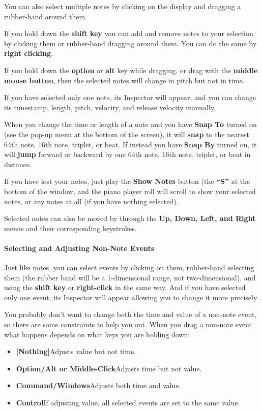 \documentclass[twoside,10pt]{article}
\begin{document}
You can also select multiple notes by clicking on the display and dragging a rubber-band around them.  

If you hold down the {\bf shift key} you can add and remove notes to your selection by clicking them or rubber-band dragging around them.  You can do the same by {\bf right clicking}.

If you hold down the {\bf option} or {\bf alt} key while dragging, or drag with the {\bf middle mouse button}, then the selected notes will change in pitch but not in time.

If you have selected only one note, its Inspector will appear, and you can change its timestamp, length, pitch, velocity, and release velocity manually.

When you change the time or length of a note and you have {\bf Snap To} turned on (see the pop-up menu at the bottom of the screen), it will {\bf snap} to the nearest 64th note, 16th note, triplet, or beat.  If instead you have {\bf Snap By} turned on, it will {\bf jump} forward or backward by one 64th note, 16th note, triplet, or beat in distance.

If you have lost your notes, just play the {\bf Show Notes} button (the {\bf ``S''} at the bottom of the window, and the piano player roll will scroll to show your selected notes, or any notes at all (if you have nothing selected).

Selected notes can also be moved by through the {\bf Up, Down, Left, and Right} menus and their corresponding keystrokes. 

\paragraph{Selecting and Adjusting Non-Note Events}

Just like notes, you can select events by clicking on them, rubber-band selecting them (the rubber band will be a 1-dimensional range, not two-dimensional), and using the {\bf shift key} or {\bf right-click} in the same way.  And if you have selected only one event, its Inspector will appear allowing you to change it more precisely.

You probably don't want to change both the time and value of a non-note event, so there are some constraints to help you out.  When you drag a non-note event what happens depends on what keys you are holding down:

\begin{itemize}
\item {\bf [Nothing]}\qquad Adjusts value but not time.
\item {\bf Option/Alt or Middle-Click}\qquad Adjusts time but not value.
\item {\bf Command/Windows}\qquad Adjusts both time and value.
\item {\bf Control}\qquad If adjusting value, all selected events are set to the same value.
\end{itemize}        
\end{document}
